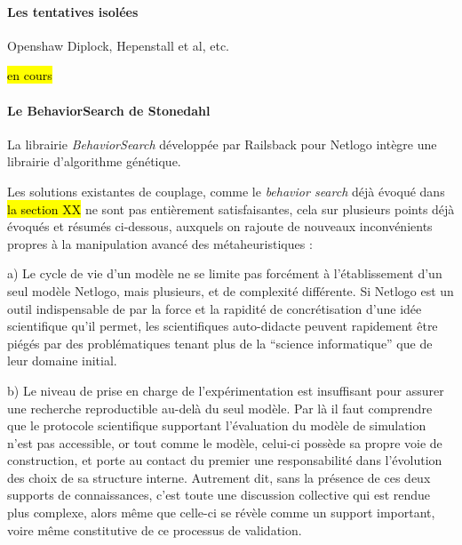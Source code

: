 \paragraph{Les tentatives isolées}

Openshaw Diplock,
Hepenstall et al,
etc.

\hl{en cours}

\paragraph{Le {BehaviorSearch} de Stonedahl}

La librairie \textit{BehaviorSearch} développée par Railsback pour Netlogo intègre une librairie d'algorithme génétique.

Les solutions existantes de couplage, comme le \textit{behavior search} déjà évoqué dans \hl{la section XX} ne sont pas entièrement satisfaisantes, cela sur plusieurs points déjà évoqués et résumés ci-dessous, auxquels on rajoute de nouveaux inconvénients propres à la manipulation avancé des métaheuristiques :

a) Le cycle de vie d'un modèle ne se limite pas forcément à l'établissement d'un seul modèle Netlogo, mais plusieurs, et de complexité différente. Si Netlogo est un outil indispensable de par la force et la rapidité de concrétisation d'une idée scientifique qu'il permet, les scientifiques auto-didacte peuvent rapidement être piégés par des problématiques tenant plus de la \enquote{science informatique} que de leur domaine initial.

b) Le niveau de prise en charge de l'expérimentation est insuffisant pour assurer une recherche reproductible au-delà du seul modèle. Par là il faut comprendre que le protocole scientifique supportant l'évaluation du modèle de simulation n'est pas accessible, or tout comme le modèle, celui-ci possède sa propre voie de construction, et porte au contact du premier une responsabilité dans l'évolution des choix de sa structure interne. Autrement dit, sans la présence de ces deux supports de connaissances, c'est toute une discussion collective qui est rendue plus complexe, alors même que celle-ci se révèle comme un support important, voire même constitutive de ce processus de validation.

